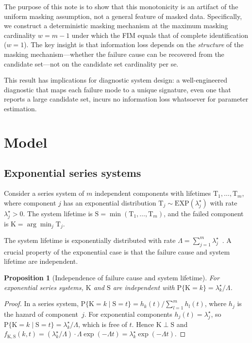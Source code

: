 \documentclass[preprint,12pt]{elsarticle}
\newcommand{\RV}[1]{\mathrm{#1}}
\newcommand{\Prob}[1]{\mathrm{P}\{#1\}}
\newcommand{\cv}{\RV{T}}           %
\newcommand{\sv}{\RV{S}}           %
\newcommand{\tparam}[1]{{#1}^{\star}}  %
\newcommand{\pdf}{f}
\newcommand{\expdist}{\mathrm{EXP}}
\newtheorem{proposition}[theorem]{Proposition}
\theoremstyle{definition}
\theoremstyle{remark}
\begin{document}
The purpose of this note is to show that this monotonicity is an artifact of the
uniform masking assumption, not a general feature of masked data. Specifically,
we construct a deterministic masking mechanism at the maximum masking cardinality
$w = m-1$ under which the FIM equals that of complete identification ($w=1$).
The key insight is that information loss depends on the \emph{structure} of the
masking mechanism---whether the failure cause can be recovered from the candidate
set---not on the candidate set cardinality per se.

This result has implications for diagnostic system design: a well-engineered
diagnostic that maps each failure mode to a unique signature, even one that
reports a large candidate set, incurs no information loss whatsoever for
parameter estimation.

\section{Model}
\label{sec:model}

\subsection{Exponential series systems}

Consider a series system of $m$ independent components with lifetimes
$\cv_1, \ldots, \cv_m$, where component $j$ has an exponential distribution
$\cv_j \sim \expdist(\tparam{\lambda}_j)$ with rate $\tparam{\lambda}_j > 0$.
The system lifetime is $\sv = \min(\cv_1, \ldots, \cv_m)$, and the failed
component is $\RV{K} = \arg\min_j \cv_j$.

The system lifetime is exponentially distributed with rate
$\Lambda = \sum_{j=1}^{m} \tparam{\lambda}_j$~\cite{barlow1975}. A crucial
property of the exponential case is that the failure cause and system lifetime
are independent.

\begin{proposition}[Independence of failure cause and system lifetime]
\label{prop:K_indep_S}
For exponential series systems, $\RV{K}$ and $\sv$ are independent with
$\Prob{\RV{K} = k} = \tparam{\lambda}_k / \Lambda$.
\end{proposition}

\begin{proof}
In a series system, $\Prob{\RV{K} = k \mid \sv = t} = h_k(t)/\sum_{l=1}^{m}
h_l(t)$, where $h_j$ is the hazard of component~$j$. For exponential
components $h_j(t) = \tparam{\lambda}_j$, so $\Prob{\RV{K} = k \mid \sv = t}
= \tparam{\lambda}_k / \Lambda$, which is free of $t$. Hence $\RV{K} \perp \sv$
and $\pdf_{\RV{K},\sv}(k,t) = (\tparam{\lambda}_k/\Lambda)\cdot\Lambda
\exp(-\Lambda t) = \tparam{\lambda}_k \exp(-\Lambda t)$.
\end{proof}
\end{document}
